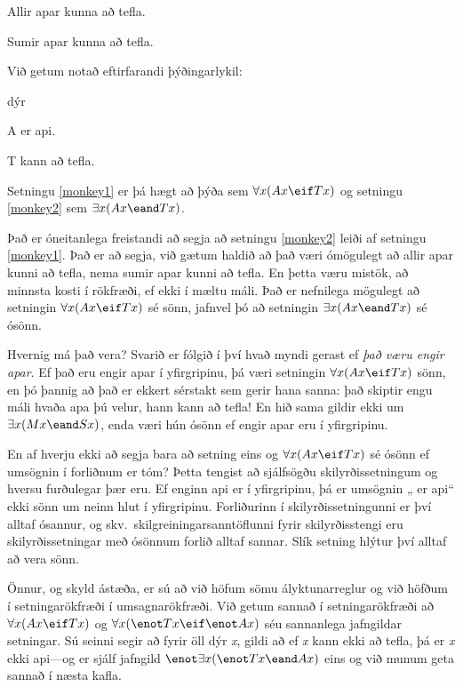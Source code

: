 	\begin{earg}
		\item[\ex{monkey1}] Allir apar kunna að tefla.
		\item[\ex{monkey2}] Sumir apar kunna að tefla.
	\end{earg}
Við getum notað eftirfarandi þýðingarlykil:	
	\begin{ekey}
		\item[\text{yfirgrip}] dýr
		\item[A]  er api.
		\item[T]  kann að tefla.
	\end{ekey}
Setningu \ref{monkey1} er þá hægt að þýða sem $\forall x(Ax \eif Tx)$ og setningu \ref{monkey2} sem $\exists x(Ax \eand Tx)$.
	
Það er óneitanlega freistandi að segja að setningu \ref{monkey2} leiði af setningu \ref{monkey1}. Það er að segja, við gætum haldið að það væri ómögulegt að allir apar kunni að tefla, nema sumir apar kunni að tefla. En þetta væru mistök, að minnsta kosti í rökfræði, ef ekki í mæltu máli. Það er nefnilega mögulegt að setningin $\forall x(Ax \eif Tx)$ sé sönn, jafnvel þó að setningin $\exists x(Ax \eand Tx)$ sé ósönn.

Hvernig má það vera? Svarið er fólgið í því hvað myndi gerast ef \emph{það væru engir apar}. Ef það eru engir apar í yfirgripinu, þá væri setningin $\forall x(Ax \eif Tx)$ sönn, en þó þannig að það er ekkert sérstakt sem gerir hana sanna: það skiptir engu máli hvaða apa þú velur, hann kann að tefla! En hið sama gildir ekki um $\exists x(Mx \eand Sx)$, enda væri hún ósönn ef engir apar eru í yfirgripinu. 

En af hverju ekki að segja bara að setning eins og $\forall x(Ax \eif Tx)$ sé ósönn ef umsögnin í forliðnum er tóm? Þetta tengist að sjálfsögðu skilyrðissetningum og hversu furðulegar þær eru. Ef enginn api er í yfirgripinu, þá er umsögnin „ er api“ ekki sönn um neinn hlut í yfirgripinu. Forliðurinn í skilyrðissetningunni er því alltaf ósannur, og skv.\ skilgreiningarsanntöflunni fyrir skilyrðisstengi eru skilyrðissetningar með ósönnum forlið alltaf sannar. Slík setning hlýtur því alltaf að vera sönn.

Önnur, og skyld ástæða, er sú að við höfum sömu ályktunarreglur og við höfðum í setningarökfræði í umsagnarökfræði. Við getum sannað í setningarökfræði að $\forall x(Ax \eif Tx)$ og $\forall x(\enot Tx \eif \enot Ax)$ séu sannanlega jafngildar setningar. Sú seinni segir að fyrir öll dýr \emph{x}, gildi að ef \emph{x} kann ekki að tefla, þá er \emph{x} ekki api---og er sjálf jafngild $\enot \exists x (\enot Tx \eand Ax)$ eins og við munum geta sannað í næsta kafla.

